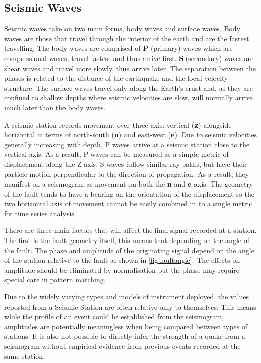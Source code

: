 \documentclass[../report.tex]{subfiles}
\begin{document}
	
\subsection{Seismic Waves} \label{sec:seismicwaves}
	Seismic waves take on two main forms, body waves and surface waves.  Body waves are those that travel through the interior of the earth and are the fastest travelling.  The body waves are comprised of \textbf{P} (primary) waves which are compressional waves, travel fastest and thus arrive first.  \textbf{S} (secondary) waves are shear waves and travel more slowly, thus arrive later.  The separation between the phases is related to the distance of the earthquake and the local velocity structure. The surface waves travel only along the Earth's crust and, as they are confined to shallow depths where seismic velocities are slow, will normally arrive much later than the body waves.
	
	A seismic station records movement over three axis: vertical (\textbf{z}) alongside horizontal in terms of north-south (\textbf{n}) and east-west (\textbf{e}).  Due to seismic velocities generally increasing with depth, P waves arrive at a seismic station close to the vertical axis.  As a result, P waves can be measured as a simple metric of displacement along the Z axis.  S waves follow similar ray paths, but have their particle motion perpendicular to the direction of propagation.  As a result, they manifest on a seismogram as movement on both the \textbf{n} and \textbf{e} axis. The geometry of the fault tends to have a bearing on the orientation of the displacement so the two horizontal axis of movement cannot be easily combined in to a single metric for time series analysis.
	
	There are three main factors that will affect the final signal recorded at a station.  The first is the fault geometry itself, this means that depending on the angle of the fault.  The phase and amplitude of the originating signal depend on the angle of the station relative to the fault as shown in \cref{fig:faultangle}.  The effects on amplitude should be eliminated by normalisation but the phase may require special care in pattern matching.
	
	Due to the widely varying types and models of instrument deployed, the values reported from a Seismic Station are often relative only to themselves.  This means while the profile of an event could be established from the seismogram, amplitudes are potentially meaningless when being compared between types of stations.  It is also not possible to directly infer the strength of a quake from a seismogram without empirical evidence from previous events recorded at the same station.
	
\end{document}
